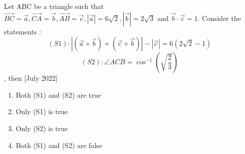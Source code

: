     \item{
        
            Let ABC be a triangle such that $ \overrightarrow{BC}=\overrightarrow{a},\overrightarrow{CA}=\overrightarrow{b},\overrightarrow{AB}=\overrightarrow{c},\left|\overrightarrow{a}\right|=6\sqrt{2},\left|\overrightarrow{b}\right|=2\sqrt{3}$ and $\overrightarrow{b}\cdot\overrightarrow{c}=1.$ 
            Consider the statements : $$ \left(S1\right):\left|\left(\overrightarrow{a}\times\overrightarrow{b}\right)+\left(\overrightarrow{c}\times\overrightarrow{b}\right)\right|-\left|\overrightarrow{c}\right|=6\left(2\sqrt{2}-1\right)$$ $$ \left(S2\right):\angle ACB=\cos^{-1}\left(\sqrt{\frac{2}{3}}\right) $$, then \text{ }
             \hfill
              {[July 2022]}
			\begin{multicols}{2}              
	              		\begin{enumerate}
	              			\item Both (S1) and (S2) are true
	              			\item Only (S1) is true
	              			\item Only (S2) is true
	              			\item Both (S1) and (S2) are false
	              	\end{enumerate}
  			\end{multicols}      
        }




